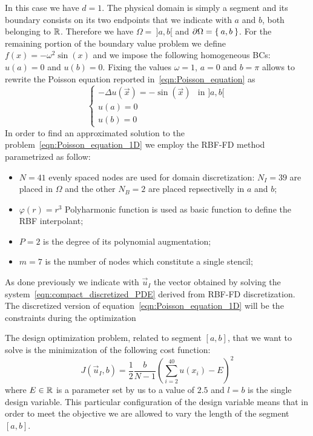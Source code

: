 In this case we have $d=1$. The physical domain is simply a segment and its boundary consists on its two endpoints that we indicate with $a$ and $b$, both belonging to $\mathbb{R}$. Therefore we have $\Omega =~]a,b[$ and $\partial\Omega = \Set{a, b}$.
For the remaining portion of the boundary value problem we define $f(x) = - \omega^2 \sin(x)$ and we impose the following homogeneous BCs: $u(a)=0$ and $u(b)=0$. Fixing the values $\omega=1$, $a=0$ and $b=\pi$ allows to rewrite the Poisson equation reported in~\eqref{eqn:Poisson_equation} as
\begin{equation}
	\label{eqn:Poisson_equation_1D}
	\begin{cases}
		- \Delta u(\vec{x}) = - \sin(\vec{x}) & \text{in $]a,b[$}  \\
		u(a) = 0  \\
		u(b) = 0
	\end{cases}
\end{equation}
In order to find an approximated solution to the problem~\eqref{eqn:Poisson_equation_1D} we employ the RBF-FD method parametrized as follow:
\begin{itemize}
	\item $N=41$ evenly spaced nodes are used for domain discretization: $N_I=39$ are placed in $\Omega$ and the other $N_B=2$ are placed repsectivelly in $a$ and $b$;
	\item $\varphi(r) = r^3$ Polyharmonic function is used as basic function to define the RBF interpolant;
	\item $P=2$ is the degree of its polynomial augmentation;
	\item $m=7$ is the number of nodes which constitute a single stencil;
\end{itemize}
As done previously we indicate with $\vec{u}_I$ the vector obtained by solving the system~\eqref{eqn:compact_discretized_PDE} derived from RBF-FD discretization.
The discretized version of equation~\eqref{eqn:Poisson_equation_1D} will be the constraints during the optimization

\smallskip
The design optimization problem, related to segment $[a,b]$, that we want to solve is the minimization of the following cost function:
\begin{equation}
	J(\vec{u}_I, b) = \frac{1}{2} \frac{b}{N-1} \left( \sum_{i=2}^{40} u(x_i) - E \right)^2
\end{equation}
where $E\in\mathbb{R}$ is a parameter set by us to a value of $2.5$ and $l=b$ is the single design variable. This particular configuration of the design variable means that in order to meet the objective we are allowed to vary the length of the segment $[a,b]$.

